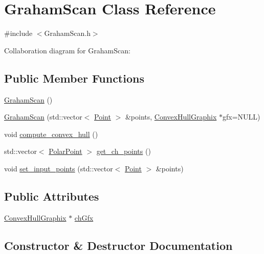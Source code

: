 \hypertarget{class_graham_scan}{}\section{Graham\+Scan Class Reference}
\label{class_graham_scan}


{\ttfamily \#include $<$Graham\+Scan.\+h$>$}



Collaboration diagram for Graham\+Scan\+:
\subsection*{Public Member Functions}
\begin{DoxyCompactItemize}
\item 
\mbox{\hyperlink{class_graham_scan_a207506a925528a889c377b39a24d879f}{Graham\+Scan}} ()
\item 
\mbox{\hyperlink{class_graham_scan_afb51d5144cdee5df588528701b63de36}{Graham\+Scan}} (std\+::vector$<$ \mbox{\hyperlink{class_point}{Point}} $>$ \&points, \mbox{\hyperlink{class_convex_hull_graphix}{Convex\+Hull\+Graphix}} $\ast$gfx=N\+U\+LL)
\item 
void \mbox{\hyperlink{class_graham_scan_a38ecf7b830f7923c4d889fa126349a7e}{compute\+\_\+convex\+\_\+hull}} ()
\item 
std\+::vector$<$ \mbox{\hyperlink{class_polar_point}{Polar\+Point}} $>$ \mbox{\hyperlink{class_graham_scan_af42f09a4283ae9821917e13322be4b49}{get\+\_\+ch\+\_\+points}} ()
\item 
void \mbox{\hyperlink{class_graham_scan_a4e22ff4e4ee0cb57ae30bd06fd39871b}{set\+\_\+input\+\_\+points}} (std\+::vector$<$ \mbox{\hyperlink{class_point}{Point}} $>$ \&points)
\end{DoxyCompactItemize}
\subsection*{Public Attributes}
\begin{DoxyCompactItemize}
\item 
\mbox{\hyperlink{class_convex_hull_graphix}{Convex\+Hull\+Graphix}} $\ast$ \mbox{\hyperlink{class_graham_scan_a3c5dda4a0c904b22a179511cc1d879ce}{ch\+Gfx}}
\end{DoxyCompactItemize}


\subsection{Constructor \& Destructor Documentation}
\mbox{\label{class_graham_scan_a207506a925528a889c377b39a24d879f}} 
